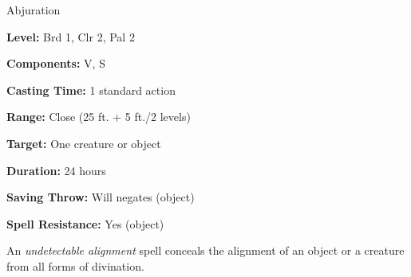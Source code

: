 
Abjuration

\textbf{Level:} Brd 1, Clr 2, Pal 2

\textbf{Components:} V, S

\textbf{Casting Time:} 1 standard action

\textbf{Range:} Close (25 ft. + 5 ft./2 levels)

\textbf{Target:} One creature or object

\textbf{Duration:} 24 hours

\textbf{Saving Throw:} Will negates (object)

\textbf{Spell Resistance:} Yes (object)

An \textit{undetectable alignment} spell conceals the alignment of an object or 
a creature from all forms of divination.

